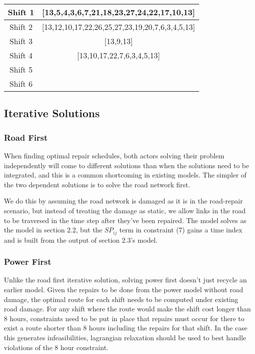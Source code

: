 \documentclass{article}
\begin{document}
{\centering
	\begin{tabular}{|c|c|}
		\hline
		Shift 1 & [13,5,4,3,6,7,21,18,23,27,24,22,17,10,13] \\
		\hline
		Shift 2 & [13,12,10,17,22,26,25,27,23,19,20,7,6,3,4,5,13] \\
		\hline
		Shift 3 & [13,9,13] \\
		\hline
		Shift 4 & [13,10,17,22,7,6,3,4,5,13] \\
		\hline
		Shift 5 &  \\
		\hline
		Shift 6 &  \\
		\hline
	\end{tabular}\par
}




\subsection{Iterative Solutions}

\subsubsection{Road First}

When finding optimal repair schedules, both actors solving their problem independently will come to different solutions than when the solutions need to be integrated, and this is a common shortcoming in existing models. The simpler of the two dependent solutions is to solve the road network first. 

We do this by assuming the road network is damaged as it is in the road-repair scenario, but instead of treating the damage as static, we allow links in the road to be traversed in the time step after they've been repaired. The model solves as the model in section 2.2, but the $SP_{ij}$ term in constraint (7) gains a time index and is built from the output of section 2.3's model.

\subsubsection{Power First}

Unlike the road first iterative solution, solving power first doesn't just recycle an earlier model. Given the repairs to be done from the power model without road damage, the optimal route for each shift needs to be computed under existing road damage. For any shift where the route would make the shift cost longer than 8 hours, constraints need to be put in place that repairs must occur for there to exist a route shorter than 8 hours including the repairs for that shift. In the case this generates infeasibilities, lagrangian relaxation should be used to best handle violations of the 8 hour constraint.
\end{document}
